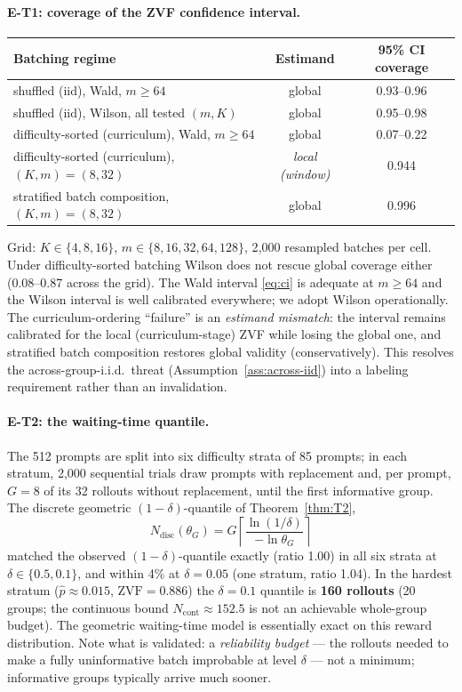 \documentclass[11pt]{article}
\theoremstyle{plain}
\theoremstyle{definition}
\theoremstyle{remark}
\newcommand{\1}{\mathbb{1}}
\begin{document}
\paragraph{E-T1: coverage of the ZVF confidence interval.}
\begin{center}
\begin{tabular}{@{}lcc@{}}
\toprule
Batching regime & Estimand & 95\% CI coverage \\
\midrule
shuffled (iid), Wald, $m\ge 64$ & global & 0.93--0.96 \\
shuffled (iid), Wilson, all tested $(m,K)$ & global & 0.95--0.98 \\
difficulty-sorted (curriculum), Wald, $m\ge 64$ & global & 0.07--0.22 \\
difficulty-sorted (curriculum), $(K,m)=(8,32)$ & \emph{local (window)} & 0.944 \\
stratified batch composition, $(K,m)=(8,32)$ & global & 0.996 \\
\bottomrule
\end{tabular}
\end{center}
Grid: $K\in\{4,8,16\}$, $m\in\{8,16,32,64,128\}$, 2{,}000 resampled batches
per cell. Under difficulty-sorted batching Wilson does not rescue global
coverage either (0.08--0.87 across the grid).
The Wald interval \eqref{eq:ci} is adequate at $m\ge 64$ and the Wilson
interval is well calibrated everywhere; we adopt Wilson operationally.
The curriculum-ordering ``failure'' is an \emph{estimand mismatch}: the
interval remains calibrated for the local (curriculum-stage) ZVF while
losing the global one, and stratified batch composition restores global
validity (conservatively). This resolves the across-group-i.i.d.\ threat
(Assumption~\ref{ass:across-iid}) into a labeling requirement rather than
an invalidation.

\paragraph{E-T2: the waiting-time quantile.} The 512 prompts are split into
six difficulty strata of 85 prompts; in each stratum, 2{,}000 sequential trials
draw prompts with replacement and, per prompt, $G{=}8$ of its 32 rollouts
without replacement, until the first informative group. The discrete
geometric $(1{-}\delta)$-quantile of Theorem~\ref{thm:T2},
\[
N_{\mathrm{disc}}(\theta_G)
=G\left\lceil\frac{\ln(1/\delta)}{-\ln\theta_G}\right\rceil
\]
matched the observed $(1{-}\delta)$-quantile exactly (ratio 1.00) in all six
strata at $\delta\in\{0.5,0.1\}$, and within 4\% at $\delta=0.05$ (one stratum,
ratio 1.04). In the hardest stratum ($\hat p\approx 0.015$,
$\mathrm{ZVF}=0.886$) the $\delta=0.1$ quantile is \textbf{160 rollouts}
(20 groups; the continuous bound $N_{\mathrm{cont}}\approx152.5$ is not an
achievable whole-group budget). The geometric waiting-time model is
essentially exact on this reward distribution. Note what is validated:
a \emph{reliability budget} --- the rollouts needed to make a fully
uninformative batch improbable at level $\delta$ --- not a minimum;
informative groups typically arrive much sooner.
\end{document}
